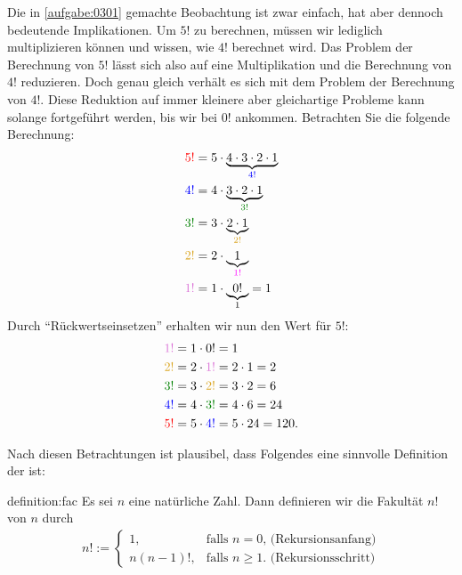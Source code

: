 \noindent
Die in \cref{aufgabe:0301} gemachte Beobachtung ist zwar einfach, hat aber dennoch bedeutende Implikationen. Um $5!$ zu berechnen, müssen wir lediglich multiplizieren können und wissen, wie $4!$ berechnet wird. Das Problem der Berechnung von $5!$ lässt sich also auf eine Multiplikation und die Berechnung von $4!$ reduzieren. Doch genau gleich verhält es sich mit dem Problem der Berechnung von $4!$. Diese Reduktion auf immer kleinere aber gleichartige Probleme kann solange fortgeführt werden, bis wir bei $0!$ ankommen. Betrachten Sie die folgende Berechnung:
\begin{align*}
    \textcolor{Red}{5!} &= 5\cdot\underbrace{4\cdot 3\cdot 2\cdot 1}_{\textcolor{Blue}{4!}} \\
    \textcolor{Blue}{4!} &= 4\cdot\underbrace{3\cdot 2\cdot 1}_{\textcolor{Green}{3!}} \\
    \textcolor{Green}{3!} &= 3\cdot\underbrace{2\cdot 1}_{\textcolor{Goldenrod}{2!}} \\
    \textcolor{Goldenrod}{2!} &= 2\cdot\underbrace{1}_{\textcolor{Fuchsia}{1!}} \\
    \textcolor{Orchid}{1!} &= 1\cdot\underbrace{0!}_{1} = 1
\end{align*}
Durch \enquote{Rückwertseinsetzen} erhalten wir nun den Wert für $5!$:
\begin{align*}
    \textcolor{Orchid}{1!} &= 1\cdot 0! = 1 \\
    \textcolor{Goldenrod}{2!} &= 2\cdot\textcolor{Orchid}{1!} = 2\cdot 1 = 2 \\
    \textcolor{Green}{3!} &= 3\cdot \textcolor{Goldenrod}{2!} = 3\cdot 2 = 6 \\
    \textcolor{Blue}{4!} &= 4\cdot\textcolor{Green}{3!} = 4\cdot 6 = 24 \\
    \textcolor{Red}{5!} &= 5\cdot\textcolor{Blue}{4!} = 5\cdot 24 = 120.
\end{align*}

\noindent
Nach diesen Betrachtungen ist plausibel, dass Folgendes eine sinnvolle Definition der  ist:
\begin{definition}[Fakultät]{definition:fac}
Es sei $n$ eine natürliche Zahl. Dann definieren wir die Fakultät $n!$ von $n$ durch
\begin{align}\label{eq:fakultaet}
n! := 
  \begin{cases}
    1, &\text{falls $n=0$, (Rekursionsanfang)} \\
    n(n-1)!, & \text{falls  $n\geq 1$. (Rekursionsschritt)}
  \end{cases}
\end{align}
\end{definition}

